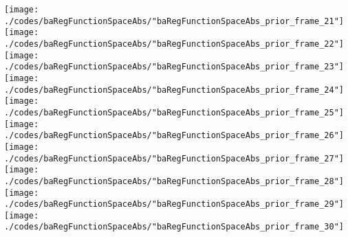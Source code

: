 \begin{frame}{\insertsection}
\begin{center}
{\begin{animateinline}{15}
				 \texttt{[image: ./codes/baRegFunctionSpaceAbs/"baRegFunctionSpaceAbs\_prior\_frame\_21"]}\newframe
				 \texttt{[image: ./codes/baRegFunctionSpaceAbs/"baRegFunctionSpaceAbs\_prior\_frame\_22"]}\newframe
				 \texttt{[image: ./codes/baRegFunctionSpaceAbs/"baRegFunctionSpaceAbs\_prior\_frame\_23"]}\newframe
				 \texttt{[image: ./codes/baRegFunctionSpaceAbs/"baRegFunctionSpaceAbs\_prior\_frame\_24"]}\newframe
				 \texttt{[image: ./codes/baRegFunctionSpaceAbs/"baRegFunctionSpaceAbs\_prior\_frame\_25"]}\newframe
				 \texttt{[image: ./codes/baRegFunctionSpaceAbs/"baRegFunctionSpaceAbs\_prior\_frame\_26"]}\newframe
				 \texttt{[image: ./codes/baRegFunctionSpaceAbs/"baRegFunctionSpaceAbs\_prior\_frame\_27"]}\newframe
				 \texttt{[image: ./codes/baRegFunctionSpaceAbs/"baRegFunctionSpaceAbs\_prior\_frame\_28"]}\newframe
				 \texttt{[image: ./codes/baRegFunctionSpaceAbs/"baRegFunctionSpaceAbs\_prior\_frame\_29"]}\newframe
				 \texttt{[image: ./codes/baRegFunctionSpaceAbs/"baRegFunctionSpaceAbs\_prior\_frame\_30"]}
			 \end{animateinline}
			}
	\end{center}
    
\end{frame}

